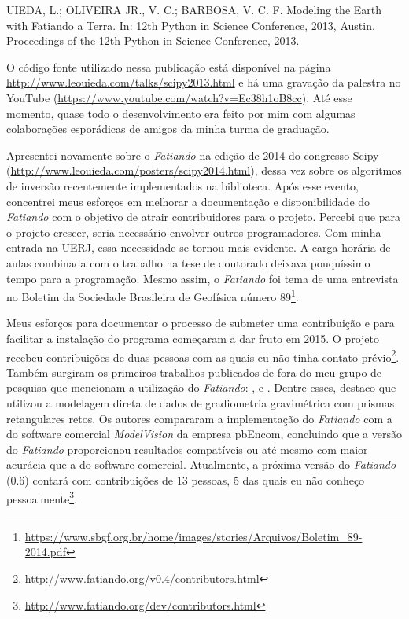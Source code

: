 \begin{displayquote}
    UIEDA, L.; OLIVEIRA JR., V. C.; BARBOSA, V. C. F.  Modeling the Earth with
    Fatiando a Terra. In: 12th Python in Science Conference, 2013, Austin.
    Proceedings of the 12th Python in Science Conference, 2013.
\end{displayquote}

O código fonte utilizado nessa publicação está disponível na página
\url{http://www.leouieda.com/talks/scipy2013.html} e há uma gravação da
palestra no YouTube (\url{https://www.youtube.com/watch?v=Ec38h1oB8cc}).
Até esse momento, quase todo o desenvolvimento era feito por mim com algumas
colaborações esporádicas de amigos da minha turma de graduação.

Apresentei novamente sobre o \textit{Fatiando} na edição de 2014 do congresso
Scipy (\url{http://www.leouieda.com/posters/scipy2014.html}), dessa vez sobre
os algoritmos de inversão recentemente implementados na biblioteca.
Após esse evento, concentrei meus esforços em melhorar a documentação e
disponibilidade do \textit{Fatiando} com o objetivo de atrair
contribuidores para o projeto.
Percebi que para o projeto crescer, seria necessário envolver outros
programadores.
Com minha entrada na UERJ, essa necessidade se tornou mais evidente.
A carga horária de aulas combinada com o trabalho na tese de doutorado deixava
pouquíssimo tempo para a programação.
Mesmo assim, o \textit{Fatiando} foi tema de uma entrevista no Boletim da
Sociedade Brasileira de Geofísica número
89\footnote{\url{https://www.sbgf.org.br/home/images/stories/Arquivos/Boletim_89-2014.pdf}}.

Meus esforços para documentar o processo de submeter uma contribuição e para
facilitar a instalação do programa começaram a dar fruto em 2015.
O projeto recebeu contribuições de duas pessoas com as quais eu não tinha
contato prévio\footnote{\url{http://www.fatiando.org/v0.4/contributors.html}}.
Também surgiram os primeiros trabalhos publicados de fora do meu grupo de
pesquisa que mencionam a utilização do \textit{Fatiando}:
\citet{niccoli2015}, \citet{matthews2016} e \citet{bassett2016}.
Dentre esses, destaco \citet{matthews2016} que utilizou a modelagem direta de
dados de gradiometria gravimétrica com prismas retangulares retos.
Os autores compararam a implementação do \textit{Fatiando} com a do software
comercial \textit{ModelVision} da empresa pbEncom, concluindo que a versão do
\textit{Fatiando} proporcionou resultados compatíveis ou até mesmo com maior
acurácia que a do software comercial.
Atualmente, a próxima versão do \textit{Fatiando} (0.6) contará com
contribuições de 13 pessoas, 5 das quais eu não conheço
pessoalmente\footnote{\url{http://www.fatiando.org/dev/contributors.html}}.

